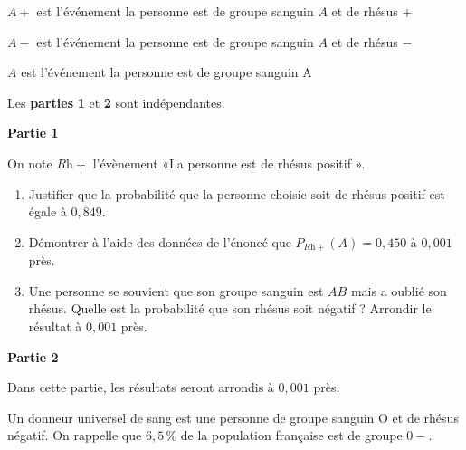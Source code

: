 $A+$ est l'événement \og la personne est de groupe sanguin $A$ et de rhésus $+$ \fg

$A-$ est l'événement \og la personne est de groupe sanguin $A$ et de rhésus $-$ \fg

$A$ est l'événement \og la personne est de groupe sanguin A \fg

\smallskip

Les \textbf{parties} \textbf{1} et \textbf{2} sont indépendantes.

\medskip

\textbf{Partie 1}

\medskip

On note $R\text{h}+$ l'évènement «La personne est de rhésus positif ».

\begin{enumerate}
	\item Justifier que la probabilité que la personne choisie soit de rhésus positif est égale à $0,849$.
	\item Démontrer à l'aide des données de l'énoncé que $P_{R\text{h}+}(A)=0,450$ à $0,001$ près.
	\item Une personne se souvient que son groupe sanguin est $AB$ mais a oublié son rhésus. Quelle est la probabilité que son rhésus soit négatif ? Arrondir le résultat à $0,001$ près.
\end{enumerate}

\medskip

\textbf{Partie 2}

\medskip

Dans cette partie, les résultats seront arrondis à $0,001$ près.

\smallskip

Un donneur universel de sang est une personne de groupe sanguin O et de rhésus négatif. On rappelle que $6,5\,\%$ de la population française est de groupe $0-$.

